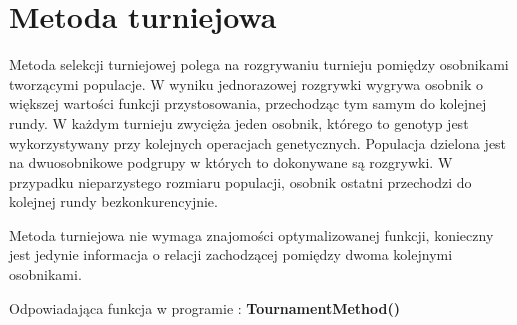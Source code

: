
\section{Metoda turniejowa}\label{sec:narzedzia}


Metoda selekcji turniejowej polega na rozgrywaniu turnieju pomiędzy osobnikami tworzącymi populacje. W wyniku jednorazowej rozgrywki wygrywa osobnik o większej wartości funkcji przystosowania, przechodząc tym samym do kolejnej rundy. W każdym turnieju zwycięża jeden osobnik, którego to genotyp jest wykorzystywany przy kolejnych operacjach genetycznych. Populacja dzielona jest na dwuosobnikowe podgrupy w których to dokonywane są rozgrywki. W przypadku nieparzystego rozmiaru populacji, osobnik ostatni przechodzi do kolejnej rundy bezkonkurencyjnie. \\
\par
Metoda turniejowa nie wymaga znajomości optymalizowanej funkcji, konieczny jest jedynie informacja o relacji zachodzącej pomiędzy dwoma kolejnymi osobnikami. 
\par
Odpowiadająca funkcja w programie : \textbf{TournamentMethod()}

